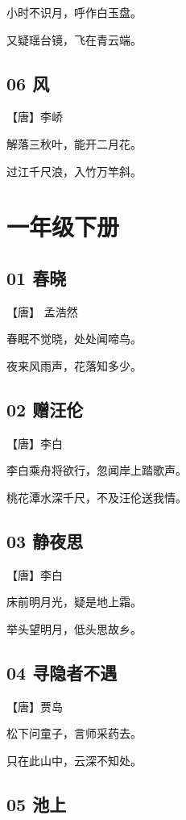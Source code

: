 \documentclass[a6paper, 12pt]{article}
\begin{document}
小时不识月，呼作白玉盘。

又疑瑶台镜，飞在青云端。

\subsection*{06 风}

【唐】李峤

解落三秋叶，能开二月花。

过江千尺浪，入竹万竿斜。

\newpage

\section*{一年级下册}

\subsection*{01 春晓}

【唐】 孟浩然

春眠不觉晓，处处闻啼鸟。

夜来风雨声，花落知多少。

\subsection*{02 赠汪伦}

【唐】李白

李白乘舟将欲行，忽闻岸上踏歌声。

桃花潭水深千尺，不及汪伦送我情。

\subsection*{03 静夜思}

【唐】李白

床前明月光，疑是地上霜。

举头望明月，低头思故乡。

\subsection*{04 寻隐者不遇}

【唐】贾岛 

松下问童子，言师采药去。

只在此山中，云深不知处。


\subsection*{05 池上}
\end{document}
